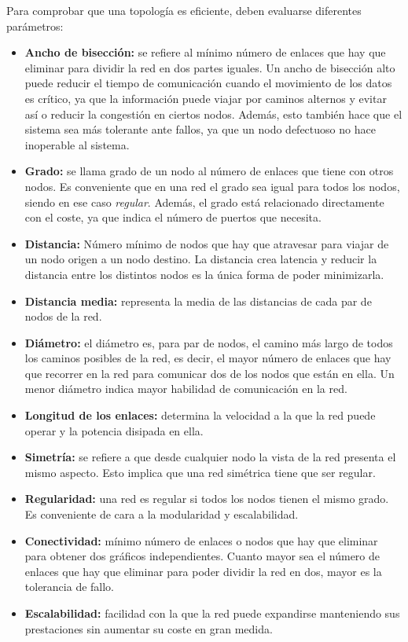 Para comprobar que una topología es eficiente, deben evaluarse diferentes parámetros:
\begin{itemize}
	\item \textbf{Ancho de bisección:} se refiere al mínimo número de enlaces que hay que eliminar para dividir la red en dos partes iguales. Un ancho de bisección alto puede reducir el tiempo de comunicación cuando el movimiento de los datos es crítico, ya que la información puede viajar por caminos alternos y evitar así o reducir la congestión en ciertos nodos. Además, esto también hace que el sistema sea más tolerante ante fallos, ya que un nodo defectuoso no hace inoperable al sistema.
	\item \textbf{Grado:} se llama grado de un nodo al número de enlaces que tiene con otros nodos. Es conveniente que en una red el grado sea igual para todos los nodos, siendo en ese caso \textit{regular}. Además, el grado está relacionado directamente con el coste, ya que indica el número de puertos que necesita.
	\item \textbf{Distancia:} Número mínimo de nodos que hay que atravesar para viajar de un nodo origen a un nodo destino. La distancia crea latencia y reducir la distancia entre los distintos nodos es la única forma de poder minimizarla.
	\item \textbf{Distancia media:} representa la media de las distancias de cada par de nodos de la red.
	\item \textbf{Diámetro:} el diámetro es, para par de nodos, el camino más largo de todos los caminos posibles de la red, es decir, el mayor número de enlaces que hay que recorrer en la red para comunicar dos de los nodos que están en ella. Un menor diámetro indica mayor habilidad de comunicación en la red.
	\item \textbf{Longitud de los enlaces:} determina la velocidad a la que la red puede operar y la potencia disipada en ella.
	\item \textbf{Simetría:} se refiere a que desde cualquier nodo la vista de la red presenta el mismo aspecto. Esto implica que una red simétrica tiene que ser regular.
	\item \textbf{Regularidad:} una red es regular si todos los nodos tienen el mismo grado. Es conveniente de cara a la modularidad y escalabilidad.
	\item \textbf{Conectividad:} mínimo número de enlaces o nodos que hay que eliminar para obtener dos gráficos independientes. Cuanto mayor sea el número de enlaces que hay que eliminar para poder dividir la red en dos, mayor es la tolerancia de fallo.
	\item \textbf{Escalabilidad:} facilidad con la que la red puede expandirse manteniendo sus prestaciones sin aumentar su coste en gran medida.
\end{itemize}


